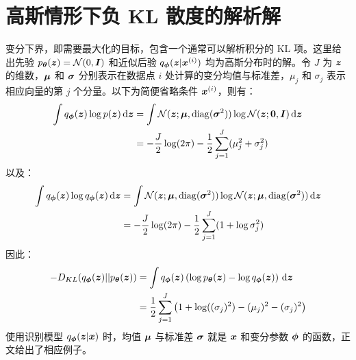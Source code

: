 \section{高斯情形下负 KL 散度的解析解}
\label{ap:kl_solution}
变分下界，即需要最大化的目标，包含一个通常可以解析积分的 KL 项。这里给出先验 $p_{\bm{\theta}}(\bm{z})=\mathcal{N}(0,\bm{I})$ 和近似后验 $q_{\bm{\phi}}(\bm{z}|\bm{x}^{(i)})$ 均为高斯分布时的解。令 $J$ 为 $\bm{z}$ 的维数，$\bm{\mu}$ 和 $\bm{\sigma}$ 分别表示在数据点 $i$ 处计算的变分均值与标准差，$\mu_j$ 和 $\sigma_j$ 表示相应向量的第 $j$ 个分量。以下为简便省略条件 $\bm{x}^{(i)}$，则有：
\begin{align*}
\int q_{\bm{\phi}}(\bm{z}) \log p(\bm{z}) \,\mathrm{d}\bm{z}
&= \int \mathcal{N}(\bm{z};\bm{\mu},\operatorname{diag}(\bm{\sigma}^2)) \log \mathcal{N}(\bm{z};\bm{0},\bm{I}) \,\mathrm{d}\bm{z} \\
&=  - \frac{J}{2} \log (2 \pi) - \frac{1}{2} \sum_{j=1}^J (\mu_j^2 + \sigma_j^2)
\end{align*}
以及：
\begin{align*}
\int q_{\bm{\phi}}(\bm{z}) \log q_{\bm{\phi}}(\bm{z}) \,\mathrm{d}\bm{z}
&= \int \mathcal{N}(\bm{z};\bm{\mu},\operatorname{diag}(\bm{\sigma}^2)) \log \mathcal{N}(\bm{z};\bm{\mu},\operatorname{diag}(\bm{\sigma}^2)) \,\mathrm{d}\bm{z} \\
&= - \frac{J}{2} \log (2 \pi) - \frac{1}{2} \sum_{j=1}^J ( 1 + \log \sigma^2_j )
\end{align*}
因此：
\begin{align*}
- D_{KL}(q_{\bm{\phi}}(\bm{z}) || p_{\bm{\theta}}(\bm{z})) &= \int q_{\bm{\phi}}(\bm{z}) \left(\log p_{\bm{\theta}}(\bm{z}) - \log q_{\bm{\phi}}(\bm{z})\right) \,\mathrm{d}\bm{z} \\
&= \frac{1}{2} \sum_{j=1}^J \left(1 + \log ((\sigma_j)^2) - (\mu_j)^2 - (\sigma_j)^2 \right)
\end{align*}
使用识别模型 $q_{\bm{\phi}}(\bm{z}|\bm{x})$ 时，均值 $\bm{\mu}$ 与标准差 $\bm{\sigma}$ 就是 $\bm{x}$ 和变分参数 $\bm{\phi}$ 的函数，正文给出了相应例子。
